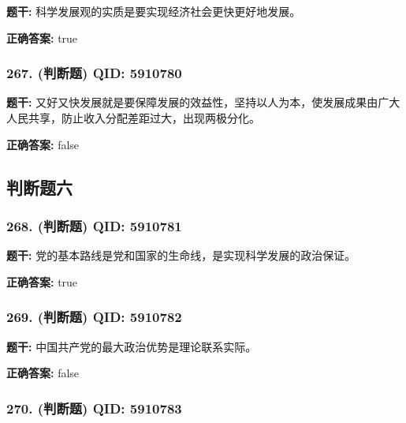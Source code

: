 \documentclass[12pt,UTF8]{ctexart}
\begin{document}
\textbf{题干:}
科学发展观的实质是要实现经济社会更快更好地发展。

\textbf{正确答案:}
true

\vspace{0.3em}\hrulefill\vspace{0.7em}

\subsubsection*{267. (判断题) \small QID: 5910780}

\textbf{题干:}
又好又快发展就是要保障发展的效益性，坚持以人为本，使发展成果由广大人民共享，防止收入分配差距过大，出现两极分化。

\textbf{正确答案:}
false

\vspace{0.3em}\hrulefill\vspace{0.7em}

\subsection*{判断题六}

\subsubsection*{268. (判断题) \small QID: 5910781}

\textbf{题干:}
党的基本路线是党和国家的生命线，是实现科学发展的政治保证。

\textbf{正确答案:}
true

\vspace{0.3em}\hrulefill\vspace{0.7em}

\subsubsection*{269. (判断题) \small QID: 5910782}

\textbf{题干:}
中国共产党的最大政治优势是理论联系实际。

\textbf{正确答案:}
false

\vspace{0.3em}\hrulefill\vspace{0.7em}

\subsubsection*{270. (判断题) \small QID: 5910783}
\end{document}
